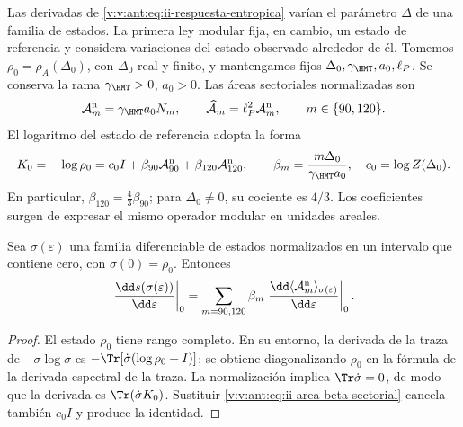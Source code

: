 Las derivadas de \eqref{v:v:ant:eq:ii-respuesta-entropica} varían el parámetro
\(\Delta\) de una familia de estados. La primera ley modular fija,
en cambio, un estado de referencia y considera variaciones del estado
observado alrededor de él. Tomemos
\(\rho_0=\rho_A(\Delta_0)\), con \(\Delta_0\) real y finito,
y mantengamos fijos \(\Delta_0,\gamma_{\HMT},a_0,\ell_P\).
Se conserva la rama \(\gamma_{\HMT}>0\), \(a_0>0\).
Las áreas sectoriales normalizadas son
\begin{equation}
 \mathcal A_m^{\rm n}=\gamma_{\HMT}a_0N_m,
 \qquad
 \widehat{\mathcal A}_m=\ell_P^2\mathcal A_m^{\rm n},
 \qquad m\in\{90,120\}.
 \label{v:v:ant:eq:ii-area-sector-normalizado}
\end{equation}
El logaritmo del estado de referencia adopta la forma
\begin{equation}
 K_0=-\log\rho_0
 =c_0I+\beta_{90}\mathcal A_{90}^{\rm n}
         +\beta_{120}\mathcal A_{120}^{\rm n},
 \qquad
 \beta_m=\frac{m\Delta_0}{\gamma_{\HMT}a_0},
 \quad c_0=\log Z(\Delta_0).
 \label{v:v:ant:eq:ii-area-beta-sectorial}
\end{equation}
En particular, \(\beta_{120}=\tfrac43\beta_{90}\); para
\(\Delta_0\ne0\), su cociente es \(4/3\). Los coeficientes
surgen de expresar el mismo operador modular en unidades areales.

\begin{theorem}
\label{v:v:ant:thm:ii-area-primera-ley}
Sea \(\sigma(\varepsilon)\) una familia diferenciable de estados
normalizados en un intervalo que contiene cero, con
\(\sigma(0)=\rho_0\). Entonces
\begin{equation}
 \left.\frac{\dd s(\sigma(\varepsilon))}{\dd\varepsilon}\right|_0
 =\sum_{m=90,120}\beta_m
   \left.\frac{\dd\langle\mathcal A_m^{\rm n}\rangle_
                       {\sigma(\varepsilon)}}{\dd\varepsilon}\right|_0.
 \label{v:v:ant:eq:ii-area-primera-ley}
\end{equation}
\end{theorem}
\begin{proof}
El estado \(\rho_0\) tiene rango completo. En su entorno, la derivada
de la traza de \(-\sigma\log\sigma\) es
\(-\Tr[\dot\sigma(\log\rho_0+I)]\); se obtiene diagonalizando
\(\rho_0\) en la fórmula de la derivada espectral de la traza.
La normalización implica \(\Tr\dot\sigma=0\), de modo que la
derivada es \(\Tr(\dot\sigma K_0)\). Sustituir
\eqref{v:v:ant:eq:ii-area-beta-sectorial} cancela también \(c_0I\) y
produce la identidad.
\end{proof}

